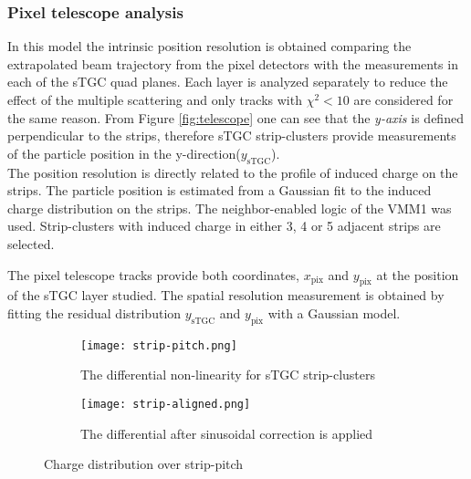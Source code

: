 \subsubsection{Pixel telescope analysis}


In this model the intrinsic position resolution is obtained comparing the extrapolated beam trajectory from the pixel
detectors with the measurements in each of the sTGC quad planes. Each layer is analyzed separately to reduce the effect
of the multiple scattering and only tracks with $\chi^2<10$ are considered for the same reason. From Figure
\ref{fig:telescope} one can see that the {\it y-axis} is defined perpendicular to the strips, therefore sTGC
strip-clusters provide measurements of the particle position in the y-direction($y_{\mathrm{sTGC}}$).\\

The position resolution is directly related to the profile of induced charge on the strips. The particle position is
estimated from a Gaussian fit to the induced charge distribution on the strips. The neighbor-enabled logic of the VMM1
was used. Strip-clusters with induced charge in either 3, 4 or 5 adjacent strips are selected.\par
	
The pixel telescope tracks provide both coordinates, $x_{\mathrm{pix}}$ and $y_{\mathrm{pix}}$ at the position of the
sTGC layer studied. The spatial resolution measurement is obtained by fitting the residual distribution
$y_{\mathrm{sTGC}}$  and $y_{\mathrm{pix}}$ with a Gaussian model.\par


\begin{figure}[ht]
	\centering
	\hspace*{\fill}
	\begin{subfigure}[b]{0.45\textwidth}
		\centering
		\texttt{[image: strip-pitch.png]}
		\caption{The differential non-linearity for sTGC strip-clusters}\label{fig:pitchfit}
	\end{subfigure}
	\hfill
	\begin{subfigure}[b]{0.45\textwidth}
		\centering
		\texttt{[image: strip-aligned.png]}
		\caption{The differential after sinusoidal correction is applied}\label{fig:pitchaligned}
	\end{subfigure}
	\hspace*{\fill}
	\caption{Charge distribution over strip-pitch}\label{fig:strip-pitch}
\end{figure}


